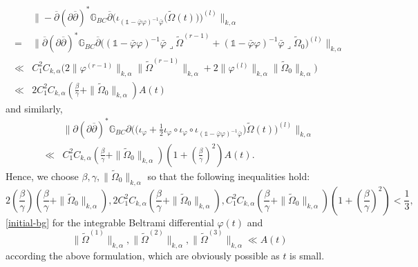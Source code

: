 \documentclass[12pt]{amsart}
\numberwithin{equation}{section}
\renewcommand{\1}{\mathds{1}}
\newcommand{\G}{\mathbb{G}}
\newcommand{\db}{\overline{\partial}}
\newcommand{\lc}{\lrcorner}
\renewcommand{\>}{\rightarrow}
\newcommand{\p}{\partial}
\def\p{\partial}
\def\b{\bar}
\begin{document}
\begin{align*}
   &\|-\db (\p\db)^* \G_{BC} \db  \Big(
\iota_{(\1-\b{\varphi}\varphi)^{-1}\b{\varphi}} \big(
\tilde{\Omega}(t) \big) \Big)^{(l)}\|_{k, \alpha}\\
=&\Big\|\db(\p\db)^*\G_{BC}\db\Big((\1-\b{\varphi}\varphi)^{-1}\b{\varphi}\lc\tilde{\Omega}^{(r-1)}
 +(\1-\b{\varphi}\varphi)^{-1}\b{\varphi}\lc\tilde{\Omega}_0\Big)^{(l)}\Big\|_{k, \alpha}\\
 \ll&
 C_1^2C_{k,\alpha}\Big(2\|\varphi^{(r-1)}\|_{k, \alpha}\|\tilde{\Omega}^{(r-1)}\|_{k,
\alpha}+2\|\varphi^{(l)}\|_{k, \alpha}\|\tilde{\Omega}_0\|_{k,
\alpha}\Big)\\
 \ll & 2C_1^2C_{k,\alpha}\left(\frac{\beta}{\gamma}+\|\tilde{\Omega}_0\|_{k,
\alpha}\right)A(t)
\end{align*}
and similarly,
\begin{align*}
   &\|\p (\p\db)^* \G_{BC} \p \Big( \big( \iota_{\varphi}+ \frac{1}{2}
\iota_{\varphi}\circ \iota_{\varphi}\circ
\iota_{(\1-\b{\varphi}\varphi)^{-1}\b{\varphi}}\big)\tilde{\Omega}(t)
\Big)^{(l)}\|_{k, \alpha}\\
 \ll & C_1^2C_{k,\alpha}\left(\frac{\beta}{\gamma}+\|\tilde{\Omega}_0\|_{k,
\alpha}\right)\left(1+\left(\frac{\beta}{\gamma}\right)^2\right)A(t).
\end{align*}
Hence, we choose $\beta,\gamma,\|\tilde{\Omega}_0\|_{k, \alpha}$ so
that the following inequalities hold:
$$2\left(\frac{\beta}{\gamma}\right)\left(\frac{\beta}{\gamma}+\|\tilde{\Omega}_0\|_{k,
\alpha}\right),
2C_1^2C_{k,\alpha}\left(\frac{\beta}{\gamma}+\|\tilde{\Omega}_0\|_{k,
\alpha}\right),
C_1^2C_{k,\alpha}\left(\frac{\beta}{\gamma}+\|\tilde{\Omega}_0\|_{k,
\alpha}\right)\left(1+\left(\frac{\beta}{\gamma}\right)^2\right)
<\frac{1}{3},$$ \eqref{initial-bg} for the integrable Beltrami
differential $\varphi(t)$ and
$$\|\tilde{\Omega}^{(1)}\|_{k, \alpha},\|\tilde{\Omega}^{(2)}\|_{k,
\alpha},\|\tilde{\Omega}^{(3)}\|_{k, \alpha}\ll A(t)$$ according the
above formulation, which are obviously possible as $t$ is small.
\end{document}
